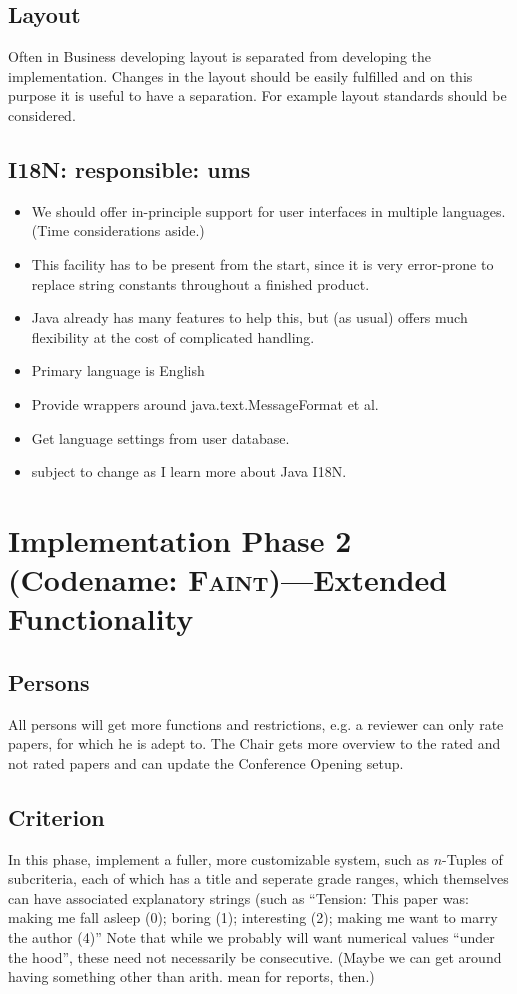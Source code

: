 \documentclass[a4paper]{article}
\begin{document}
  \subsection{Layout} \label{sec:1:layout}
  Often in Business developing layout is separated from developing the implementation. Changes in the layout should be easily fulfilled and on this purpose it is useful to have a separation. For example layout standards should be considered.
  \subsection{I18N: responsible: ums}\label{sec:1:i18n}
  \begin{itemize}
  \item We should offer in-principle support for user interfaces in
    multiple languages. (Time considerations aside.)
  \item This facility has to be present from the start, since it is
    very error-prone to replace string constants throughout a finished
    product.
  \item Java already has many features to help this, but (as usual)
    offers much flexibility at the cost of complicated handling.
  \item Primary language is English
  \item Provide wrappers around java.text.MessageFormat et al.
  \item Get language settings from user database.
  \item subject to change as I learn more about Java I18N.
  \end{itemize}
 
  \section{Implementation Phase 2 (Codename: \textsc{Faint})---Extended Functionality}
	\subsection{Persons}\label{sec:2:persons}
	All persons will get more functions and restrictions, e.g. a reviewer can only rate papers, for which he is adept to.
	The Chair gets more overview to the rated and not rated papers and can update the Conference Opening setup.
  \subsection{Criterion}\label{sec:2:criterion}
  In this phase, implement a fuller, more customizable system, such as
  $n$-Tuples of subcriteria, each of which has a title and seperate
  grade ranges, which themselves can have associated explanatory
  strings (such as ``Tension: This paper was: making me fall asleep
  (0); boring (1); interesting (2); making me want to marry the author
  (4)'' Note that while we probably will want numerical values ``under
  the hood'', these need not necessarily be consecutive. (Maybe we can
  get around having something other than arith. mean for reports,
  then.)
\end{document}
